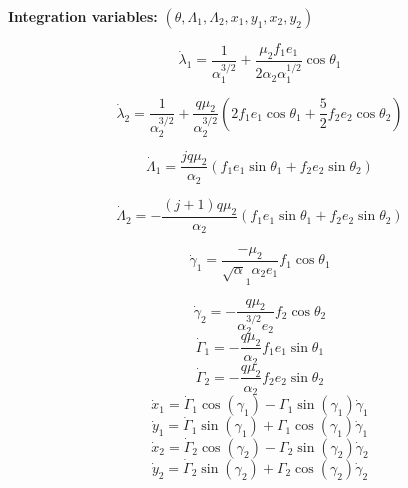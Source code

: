 \documentclass[12pt]{article}
\begin{document}
\textbf{Integration variables:} $(\theta, \Lambda_1, \Lambda_2, x_1, y_1, x_2, y_2)$


\begin{equation}
\dot{\lambda}_{1}=\frac{1}{\alpha_1^{3 / 2}}+\frac{\mu_{2} f_{1} e_{1}}{2 \alpha_{2} \alpha_{1}^{1 / 2}} \cos \theta_{1}
\end{equation}

\begin{equation}
\dot{\lambda}_{2}=\frac{1}{\alpha_{2}^{3 / 2}}+\frac{q \mu_{2}}{\alpha_{2}^{3 / 2}}\left(
2 f_{1} e_{1} \cos \theta_{1}
+\frac{5}{2} f_{2} e_{2} \cos \theta_{2}
\right)
\end{equation}

\begin{equation}
\dot{\Lambda}_{1}=\frac{jq \mu_{2}}{\alpha_{2}} \left(f_{1} e_{1} \sin \theta_{1}+f_{2} e_{2} \sin \theta_{2}\right)
\end{equation}

\begin{equation}
\dot{\Lambda}_2=-\frac{(j+1)q \mu_{2}}{\alpha_{2}}\left(f_{1} e_{1} \sin \theta_{1}+f_{2} e_{2} \sin \theta_{2}\right)
\end{equation}

\begin{equation}
\dot{\gamma}_{1}=\frac{- \mu_{2}}{\sqrt\alpha_{1} \alpha_{2} e_{1}} f_{1} \cos \theta_{1}
\end{equation}

\begin{equation}
\dot{\gamma}_{2}=-\frac{q \mu_{2}}{\alpha_{2}^{3/2} e_{2}} f_{2} \cos \theta_{2} 
\end{equation}
\begin{equation}
\dot{\Gamma}_{1}=-\frac{q \mu_{2}}{\alpha_{2}} f_{1} e_{1} \sin \theta_{1}
\end{equation}
\begin{equation}
\dot{\Gamma}_{2}=-\frac{q \mu_{2}}{\alpha_{2}} f_{2} e_{2} \sin \theta_{2}
\end{equation}
\begin{equation}
\dot{x}_{1} = \dot{\Gamma}_{1}\cos(\gamma_1) - \Gamma_1\sin(\gamma_1)\dot{\gamma}_{1}
\end{equation}
\begin{equation}
\dot{y}_{1} = \dot{\Gamma}_{1}\sin(\gamma_1) + \Gamma_1\cos(\gamma_1)\dot{\gamma}_{1}
\end{equation}
\begin{equation}
\dot{x}_{2} = \dot{\Gamma}_{2}\cos(\gamma_2) - \Gamma_2\sin(\gamma_2)\dot{\gamma}_{2}
\end{equation}
\begin{equation}
\dot{y}_{2} = \dot{\Gamma}_{2}\sin(\gamma_2) + \Gamma_2\cos(\gamma_2)\dot{\gamma}_{2}
\end{equation}
\end{document}
